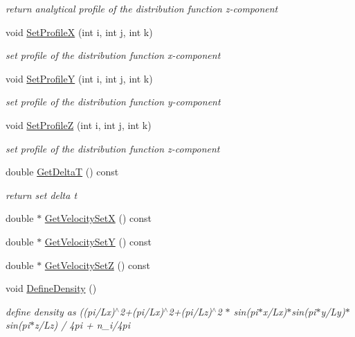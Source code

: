 \begin{DoxyCompactItemize}
\begin{DoxyCompactList}\small\item\em return analytical profile of the distribution function z-\/component \end{DoxyCompactList}\item 
void \mbox{\hyperlink{classkinetic_a7c0840510c51dc520d28db3080d6ed73}{Set\+ProfileX}} (int i, int j, int k)
\begin{DoxyCompactList}\small\item\em set profile of the distribution function x-\/component \end{DoxyCompactList}\item 
void \mbox{\hyperlink{classkinetic_a93a573e6be25179788110632d4eac6e5}{Set\+ProfileY}} (int i, int j, int k)
\begin{DoxyCompactList}\small\item\em set profile of the distribution function y-\/component \end{DoxyCompactList}\item 
void \mbox{\hyperlink{classkinetic_af3dcca37fa51324f1f361665f3ada0d6}{Set\+ProfileZ}} (int i, int j, int k)
\begin{DoxyCompactList}\small\item\em set profile of the distribution function z-\/component \end{DoxyCompactList}\item 
double \mbox{\hyperlink{classkinetic_a99d22d7ef6a68fb16f1873ba0a91e55b}{Get\+DeltaT}} () const
\begin{DoxyCompactList}\small\item\em return set delta t \end{DoxyCompactList}\item 
double $\ast$ \mbox{\hyperlink{classkinetic_ac19955de68dae320c6340259e8f8a700}{Get\+Velocity\+SetX}} () const
\item 
double $\ast$ \mbox{\hyperlink{classkinetic_a2a7f9c38c1f9f6fac18ff121e1b2177e}{Get\+Velocity\+SetY}} () const
\item 
double $\ast$ \mbox{\hyperlink{classkinetic_a596368db571a795a6c3476f0ac0006bc}{Get\+Velocity\+SetZ}} () const
\item 
void \mbox{\hyperlink{classkinetic_a81e02890b75dcffc4a9e2053a4617877}{Define\+Density}} ()
\begin{DoxyCompactList}\small\item\em define density as ((pi/\+Lx)$^\wedge$2+(pi/\+Lx)$^\wedge$2+(pi/\+Lz)$^\wedge$2 $\ast$ sin(pi$\ast$x/\+Lx)$\ast$sin(pi$\ast$y/\+Ly)$\ast$sin(pi$\ast$z/\+Lz) / 4pi + n\+\_\+i/4pi \end{DoxyCompactList}\end{DoxyCompactItemize}


